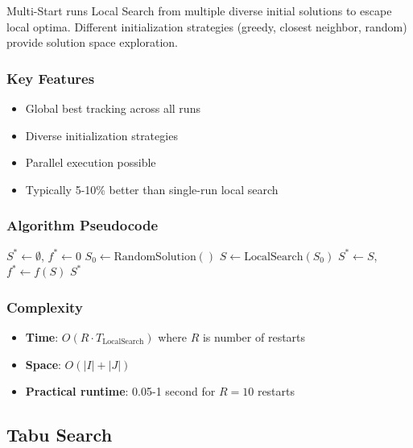 \documentclass[11pt,a4paper]{article}
\begin{document}
Multi-Start runs Local Search from multiple diverse initial solutions to escape local optima. Different initialization strategies (greedy, closest neighbor, random) provide solution space exploration.

\subsubsection{Key Features}
\begin{itemize}
  \item Global best tracking across all runs
  \item Diverse initialization strategies
  \item Parallel execution possible
  \item Typically 5-10\% better than single-run local search
\end{itemize}

\subsubsection{Algorithm Pseudocode}

\begin{algorithm}[H]
\caption{Multi-Start Local Search}
\begin{algorithmic}[1]
\State $S^* \leftarrow \emptyset$, $f^* \leftarrow 0$
 
    \State $S_0 \leftarrow \text{RandomSolution}()$
    \State $S \leftarrow \text{LocalSearch}(S_0)$
        \State $S^* \leftarrow S$, $f^* \leftarrow f(S)$
    \EndIf
\EndFor
\State \Return $S^*$
\end{algorithmic}
\end{algorithm}

\subsubsection{Complexity}
\begin{itemize}
  \item \textbf{Time}: $O(R \cdot T_{\text{LocalSearch}})$ where $R$ is number of restarts
  \item \textbf{Space}: $O(|I| + |J|)$
  \item \textbf{Practical runtime}: 0.05-1 second for $R=10$ restarts
\end{itemize}

\subsection{Tabu Search}
\end{document}
